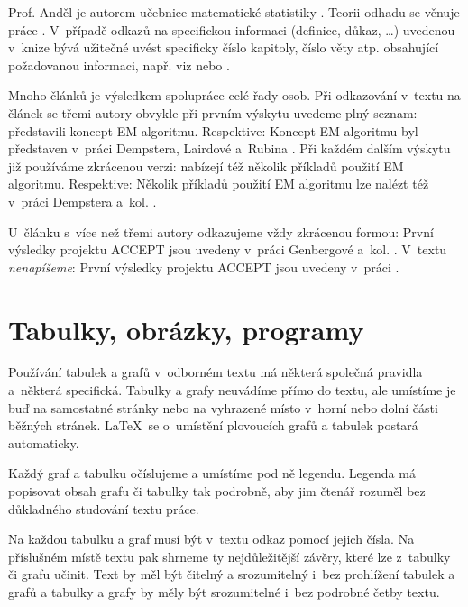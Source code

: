Prof. Anděl je autorem učebnice matematické statistiky
\citep[viz][]{Andel98}. Teorii odhadu se věnuje práce
\citet{LehmannCasella98}. V~případě odkazů na specifickou informaci
(definice, důkaz, \dots) uvedenou v~knize bývá užitečné uvést
specificky číslo kapitoly, číslo věty atp. obsahující požadovanou
informaci, např. viz \citet[Věta 4.22]{Andel07} nebo \citep[viz][Věta
4.22]{Andel07}.

Mnoho článků je výsledkem spolupráce celé řady osob. Při odkazování
v~textu na článek se třemi autory obvykle při prvním výskytu uvedeme
plný seznam: \citet*{DempsterLairdRubin77} představili koncept EM
algoritmu. Respektive: Koncept EM algoritmu byl představen v~práci
Dempstera, Lairdové a~Rubina \citep*{DempsterLairdRubin77}. Při každém
dalším výskytu již používáme zkrácenou verzi:
\citet{DempsterLairdRubin77} nabízejí též několik příkladů použití EM
algoritmu. Respektive: Několik příkladů použití EM algoritmu lze
nalézt též v~práci Dempstera a~kol. \citep{DempsterLairdRubin77}.

U~článku s~více než třemi autory odkazujeme vždy zkrácenou formou:
První výsledky projektu ACCEPT jsou uvedeny v~práci Genbergové a~kol.
\citep{Genberget08}. V~textu \emph{nenapíšeme}: První výsledky
projektu ACCEPT jsou uvedeny v~práci \citet*{Genberget08}.








\chapter{Tabulky, obrázky, programy}

Používání tabulek a grafů v~odborném textu má některá společná
pravidla a~některá specifická. Tabulky a grafy neuvádíme přímo do
textu, ale umístíme je buď na samostatné stránky nebo na vyhrazené
místo v~horní nebo dolní části běžných stránek. \LaTeX\ se o~umístění
plovoucích grafů a tabulek postará automaticky.

Každý graf a tabulku
očíslujeme a umístíme pod ně legendu. Legenda má popisovat obsah grafu
či tabulky tak podrobně, aby jim čtenář rozuměl bez důkladného
studování textu práce.

Na každou tabulku a graf musí být v~textu odkaz
pomocí jejich čísla. Na příslušném místě textu pak shrneme ty
nejdůležitější závěry, které lze z~tabulky či grafu učinit. Text by
měl být čitelný a srozumitelný i~bez prohlížení tabulek a grafů a
tabulky a grafy by měly být srozumitelné i~bez podrobné četby textu.

